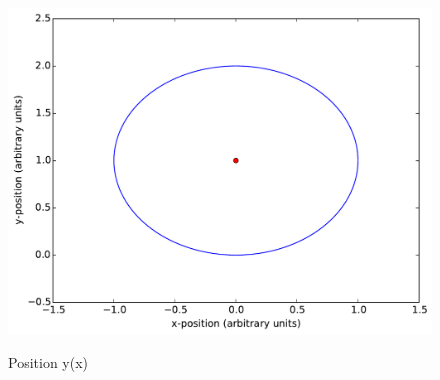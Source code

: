 \begin{figure}
{            \includegraphics[scale=0.24]{fig/pe/pe_y(x)_euler_symplectic.pdf}
            \label{fig:pe_y(x)_euler_symplectic}
        }
        \caption{Position y(x)}
    \label{fig:pe_y(x)_euler}
\end{figure}

